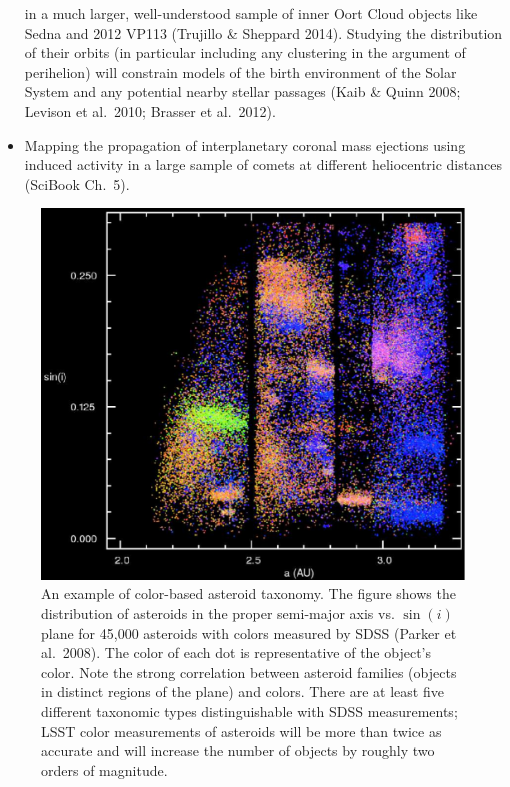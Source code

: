 \documentclass{emulateapj}
\begin{document}
\begin{itemize}
in a much larger, well-understood sample of inner Oort Cloud objects like Sedna and 2012 VP113
 (Trujillo \& Sheppard 2014).  Studying the distribution of their orbits (in particular including any 
clustering in the argument of perihelion) will constrain models of the birth environment of the 
Solar System and any potential nearby stellar passages (Kaib \& Quinn 2008; Levison et al.~2010;
Brasser et al.~2012). 
\item Mapping the propagation of interplanetary coronal mass ejections using induced 
 activity in a large sample of comets at different heliocentric distances
(SciBook Ch.~5).
\end{itemize}


\begin{figure}
\includegraphics[width=1.0\hsize,clip]{asteroids.pdf}
\caption{An example of color-based asteroid taxonomy. The figure
shows the distribution of asteroids in the proper semi-major axis vs. $\sin(i)$
plane for 45,000 asteroids with colors measured by SDSS (Parker et al.~2008). 
The color of each dot is representative of the object's color.
Note the strong correlation between asteroid families (objects in distinct regions
of the plane) and colors. There are
at least five different taxonomic types distinguishable with SDSS measurements;
LSST color measurements of asteroids will be more than twice as accurate
and will increase the number of objects by roughly two orders of magnitude.} 
\label{Fig:asteroids}
\end{figure}
\end{document}
